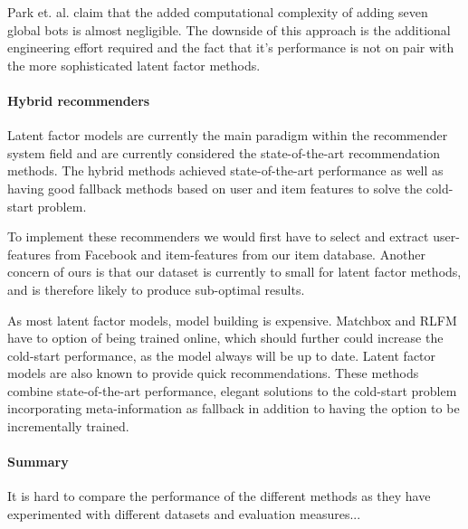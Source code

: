 Park et. al. \cite{Park2006} claim that the added computational complexity of
adding seven global bots is almost negligible. The downside of this approach is
the additional engineering effort required and the fact that it's performance
is not on pair with the more sophisticated latent factor methods.

\paragraph{Hybrid recommenders}


Latent factor models are currently the main paradigm within the recommender
system field and are currently considered the state-of-the-art recommendation
methods. The hybrid methods achieved state-of-the-art performance as well as
having good fallback methods based on user and item features to solve the
cold-start problem.

To implement these recommenders we would first have to select and extract
user-features from Facebook and item-features from our item database. Another
concern of ours is that our dataset is currently to small for latent factor
methods, and is therefore likely to produce sub-optimal results.

As most latent factor models, model building is expensive. Matchbox and RLFM
have to option of being trained online, which should further could increase the
cold-start performance, as the model always will be up to date. Latent factor
models are also known to provide quick recommendations. These methods combine
state-of-the-art performance, elegant solutions to the cold-start problem
incorporating meta-information as fallback in addition to having the option to
be incrementally trained.\newline

\paragraph{Summary}


It is hard to compare the performance of the different methods as they have
experimented with different datasets and evaluation measures...

